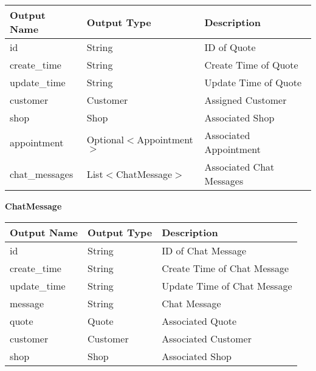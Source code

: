 \documentclass[12pt, titlepage]{article}
\begin{document}
\begin{table}[H]
	\begin{tabular}{|l|l|l|}
		\hline
		\textbf{Output Name} & \textbf{Output Type}      & \textbf{Description}     \\
		\hline
		id                   & String                    & ID of Quote              \\
		\hline
		create\_time         & String                    & Create Time of Quote     \\
		\hline
		update\_time         & String                    & Update Time of Quote     \\
		\hline
		customer             & Customer                  & Assigned Customer        \\
		\hline
		shop                 & Shop                      & Associated Shop          \\
		\hline
		appointment          & Optional$<$Appointment$>$ & Associated Appointment   \\
		\hline
		chat\_messages       & List$<$ChatMessage$>$     & Associated Chat Messages \\
		\hline
	\end{tabular}
\end{table}

\textbf{ChatMessage}

\begin{table}[H]
	\begin{tabular}{|l|l|l|}
		\hline
		\textbf{Output Name} & \textbf{Output Type} & \textbf{Description}        \\
		\hline
		id                   & String               & ID of Chat Message          \\
		\hline
		create\_time         & String               & Create Time of Chat Message \\
		\hline
		update\_time         & String               & Update Time of Chat Message \\
		\hline
		message              & String               & Chat Message                \\
		\hline
		quote                & Quote                & Associated Quote            \\
		\hline
		customer             & Customer             & Associated Customer         \\
		\hline
		shop                 & Shop                 & Associated Shop             \\
		\hline
	\end{tabular}
\end{table}
\end{document}
